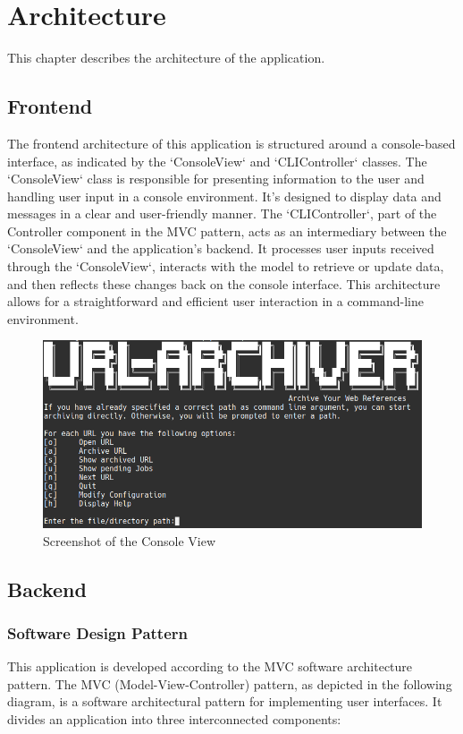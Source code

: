 \section{Architecture}
This chapter describes the architecture of the application. 

\subsection{Frontend}
The frontend architecture of this application is structured around a console-based interface, as indicated by the `ConsoleView` and `CLIController` classes. The `ConsoleView` class is responsible for presenting information to the user and handling user input in a console environment. It's designed to display data and messages in a clear and user-friendly manner. The `CLIController`, part of the Controller component in the MVC pattern, acts as an intermediary between the `ConsoleView` and the application's backend. It processes user inputs received through the `ConsoleView`, interacts with the model to retrieve or update data, and then reflects these changes back on the console interface. This architecture allows for a straightforward and efficient user interaction in a command-line environment.
\vskip 0.5cm
\begin{figure}[h!]
    \center
    \includegraphics[width=1\textwidth]{pictures/final_presentation/command_line_application.jpg}
    \caption{Screenshot of the Console View}
    \label{fig:Screenshot_ConsoleView}
\end{figure}



\clearpage

\subsection{Backend}

\subsubsection{Software Design Pattern}
This application is developed according to the MVC software architecture pattern. 
The MVC (Model-View-Controller) pattern, as depicted in the following diagram, is a software architectural pattern for implementing user interfaces. It divides an application into three interconnected components:

